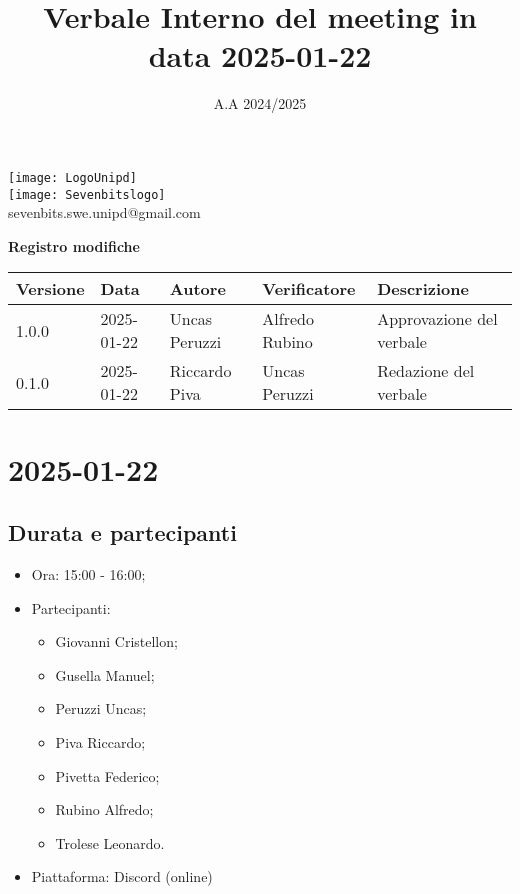 \documentclass[10pt]{article}
\title{Verbale Interno del meeting in data 2025-01-22}
\date{A.A 2024/2025}
\begin{document}
\maketitle
\begin{center}
\texttt{[image: LogoUnipd]}\\
\texttt{[image: Sevenbitslogo]}\\
sevenbits.swe.unipd@gmail.com\\
\vspace{2mm}

\textbf{Registro modifiche}\\
\vspace{2mm}
\begin{tabularx}{\textwidth}{|l|l|l|l|X|}
\hline
\textbf{Versione} & \textbf{Data} & \textbf{Autore} & \textbf{Verificatore} & \textbf{Descrizione} \\
\hline
1.0.0 & 2025-01-22 & Uncas Peruzzi & Alfredo Rubino & Approvazione del verbale \\
\hline
0.1.0 & 2025-01-22 & Riccardo Piva & Uncas Peruzzi & Redazione del verbale \\
\hline
\end{tabularx}
\end{center}

\newpage
\tableofcontents
\newpage
\section{2025-01-22}
\subsection{Durata e partecipanti}
\begin{itemize}
\item Ora: 15:00 - 16:00;
\item Partecipanti:
	\begin{itemize}
    	\item Giovanni Cristellon;
		\item Gusella Manuel;
		\item Peruzzi Uncas;
		\item Piva Riccardo;
		\item Pivetta Federico;
		\item Rubino Alfredo;
		\item Trolese Leonardo.
	\end{itemize}
\item Piattaforma: Discord (online)
\end{itemize}
\end{document}
